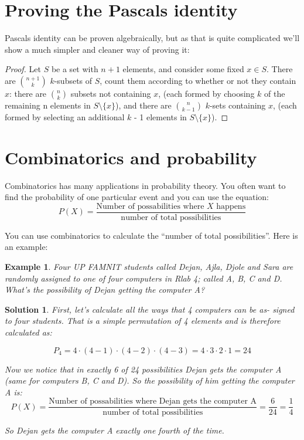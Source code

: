 \documentclass[11pt,a4paper]{article}
\newtheorem{ex}{Example}
\newtheorem{sol}{Solution}
\begin{document}
\section{Proving the Pascals identity}
Pascals identity can be proven algebraically, but as that is quite complicated
we’ll show a much simpler and cleaner way of proving it: \\

\begin{proof}
	Let $S$ be a set with $n + 1$ elements, and consider some fixed $x \in S$.
	There are ${n+1 \choose k}$ $k$-subsets of $S$, count them according to whether or not they
	contain $x$: there are ${n \choose k}$ subsets not containing $x$, (each formed by choosing $k$ of the
	remaining n elements in $S \setminus \{x\}$), and there are ${n \choose k-1}$
	$k$-sets containing $x$,
	(each formed by selecting an additional $k$ - 1 elements in $S \setminus \{x\}$).
\end{proof}
\section{Combinatorics and probability}
Combinatorics has many applications in probability theory. You often want
to find the probability of one particular event and you can use the equation:
$$P(X) = \frac{\text{Number of possabilities where } X \text{ happens}}{\text{number of total possibilities}}$$

You can use combinatorics to calculate the “number of total possibilities”. Here is an example:

\begin{ex}
	Four UP FAMNIT students called Dejan, Ajla, Djole and Sara
	are randomly assigned to one of four computers in Rlab 4; called A, B, C
	and D. What’s the possibility of Dejan getting the computer A?
\end{ex}

\begin{sol}
	First, let’s calculate all the ways that 4 computers can be as-
	signed to four students. That is a simple permutation of 4 elements and is
	therefore calculated as:
	
	$$ P_4 = 4 \cdot (4-1) \cdot (4-2) \cdot (4-3) = 4 \cdot 3 \cdot 2 \cdot 1 = 24  $$
	
	Now we notice that in exactly 6 of 24 possibilities Dejan gets the computer
	A (same for computers B, C and D). So the possibility of him getting the
	computer A is:
	$$P(X) = \frac{\text{Number of possabilities where Dejan gets the computer A}}{\text{number of total possibilities}} = \frac{6}{24} = \frac{1}{4}$$
	
	So Dejan gets the computer A exactly one fourth of the time.
\end{sol}
\end{document}
